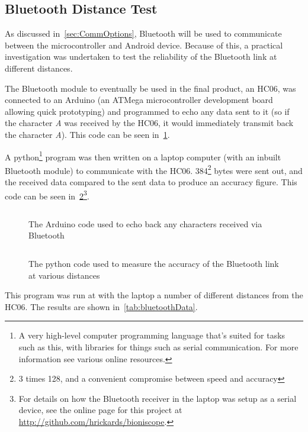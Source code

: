 \subsection{Bluetooth Distance Test}

As discussed in~\cref{sec:CommOptions}, Bluetooth will be used to communicate
between the microcontroller and Android device. Because of this, a practical
investigation was undertaken to test the reliability of the Bluetooth link at
different distances.

The Bluetooth module to eventually be used in the final product, an HC06, was
connected to an Arduino (an ATMega microcontroller development board allowing
quick prototyping) and programmed to echo any data sent to it (so if the
character \textit{A} was received by the HC06, it would immediately transmit
back the character \textit{A}). This code can be seen
in~\cref{lst:bluetoothDistanceTestArduino}.

A python\footnote{A very high-level computer programming language that's suited
  for tasks such as this, with libraries for things such as serial
communication. For more information see various online resources.} program was
then written on a laptop computer (with an inbuilt Bluetooth module) to
communicate with the HC06. 384\footnote{3 times 128, and a convenient compromise
between speed and accuracy} bytes were sent out, and the received data compared
to the sent data to produce an accuracy figure. This code can be seen
in~\cref{lst:bluetoothDistanceTestPython}\footnote{For details on how the
  Bluetooth receiver in the laptop was setup as a serial device, see the online
page for this project at \url{http://github.com/hrickards/bioniscope}.}.

\begin{figure}
  \inputminted{c}{code/bluetooth.ino}
  \caption{The Arduino code used to echo back any characters received via
  Bluetooth}
  \label{lst:bluetoothDistanceTestArduino}
\end{figure}

\begin{figure}
  \inputminted{python}{code/bluetooth.py}
  \caption{The python code used to measure the accuracy of the Bluetooth link at various distances}
  \label{lst:bluetoothDistanceTestPython}
\end{figure}

This program was run at with the laptop a number of different distances from the
HC06. The results are shown in~\cref{tab:bluetoothData}.

